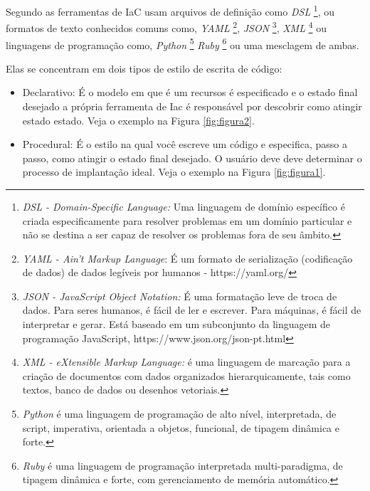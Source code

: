 Segundo  as ferramentas de IaC usam arquivos de definição como \textit{DSL} \footnote{\textit{DSL - Domain-Specific Language:} Uma linguagem de domínio específico é criada especificamente para resolver problemas em um domínio particular e não se destina a ser capaz de resolver os problemas fora de seu âmbito. }, ou formatos de texto conhecidos comuns como, \textit{ YAML} \footnote{\textit{YAML - Ain't  Markup Language}: É um formato de serialização (codificação de dados) de dados legíveis por humanos -  https://yaml.org/ }, \textit{JSON} \footnote{\textit{JSON - JavaScript Object Notation:} É uma formatação leve de troca de dados. Para seres humanos, é fácil de ler e escrever. Para máquinas, é fácil de interpretar e gerar. Está baseado em um subconjunto da linguagem de programação JavaScript, https://www.json.org/json-pt.html}, \textit{XML} \footnote{\textit{XML - eXtensible Markup Language:} é uma linguagem de marcação para a criação de documentos com dados organizados hierarquicamente, tais como textos, banco de dados ou desenhos vetoriais.}
  ou linguagens de programação como, \textit{Python} \footnote{\textit{Python} é uma linguagem de programação de alto nível, interpretada, de script, imperativa, orientada a objetos, funcional, de tipagem dinâmica e forte.}  \textit{Ruby} \footnote{\textit{Ruby} é uma linguagem de programação interpretada multi-paradigma, de tipagem dinâmica e forte, com gerenciamento de memória automático.}  ou uma mesclagem de ambas.
  
  Elas se concentram em dois tipos de estilo de escrita de código: 
   \begin{itemize}
       \item Declarativo: É o modelo em que é um recursos é especificado e o estado final desejado a própria ferramenta de Iac é responsável por descobrir como atingir estado estado. Veja o exemplo na Figura \ref{fig:figura2}.
   \end{itemize}

 \begin{itemize}
    \item Procedural: É o estilo na qual você escreve um código e especifica, passo a passo, como atingir o estado final desejado. O usuário deve deve determinar o processo de implantação ideal. Veja o exemplo na Figura \ref{fig:figura1}.
   \end{itemize}
   
